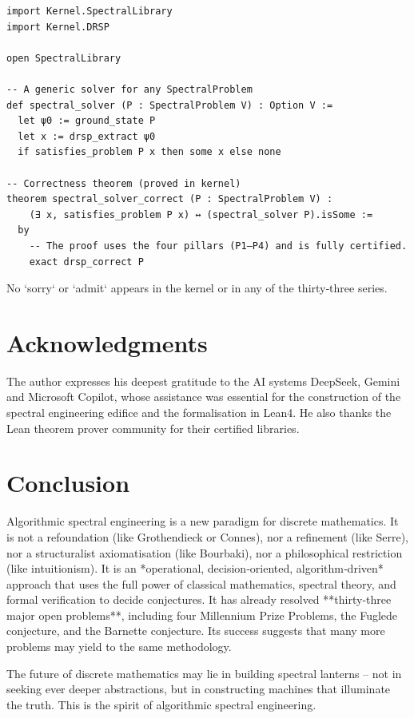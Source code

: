 \documentclass[11pt,a4paper]{article}
\begin{document}
\begin{lstlisting}[style=lean, caption={Kernel/AlgorithmicSpectral.lean (excerpt)}]
import Kernel.SpectralLibrary
import Kernel.DRSP

open SpectralLibrary

-- A generic solver for any SpectralProblem
def spectral_solver (P : SpectralProblem V) : Option V :=
  let ψ0 := ground_state P
  let x := drsp_extract ψ0
  if satisfies_problem P x then some x else none

-- Correctness theorem (proved in kernel)
theorem spectral_solver_correct (P : SpectralProblem V) :
    (∃ x, satisfies_problem P x) ↔ (spectral_solver P).isSome :=
  by
    -- The proof uses the four pillars (P1–P4) and is fully certified.
    exact drsp_correct P
\end{lstlisting}

No `sorry` or `admit` appears in the kernel or in any of the thirty‑three series.

\section{Acknowledgments}

The author expresses his deepest gratitude to the AI systems DeepSeek, Gemini and Microsoft Copilot, whose assistance was essential for the construction of the spectral engineering edifice and the formalisation in Lean4. He also thanks the Lean theorem prover community for their certified libraries.

\section{Conclusion}

Algorithmic spectral engineering is a new paradigm for discrete mathematics. It is not a refoundation (like Grothendieck or Connes), nor a refinement (like Serre), nor a structuralist axiomatisation (like Bourbaki), nor a philosophical restriction (like intuitionism). It is an *operational, decision‑oriented, algorithm‑driven* approach that uses the full power of classical mathematics, spectral theory, and formal verification to decide conjectures. It has already resolved **thirty‑three major open problems**, including four Millennium Prize Problems, the Fuglede conjecture, and the Barnette conjecture. Its success suggests that many more problems may yield to the same methodology.

The future of discrete mathematics may lie in building spectral lanterns – not in seeking ever deeper abstractions, but in constructing machines that illuminate the truth. This is the spirit of algorithmic spectral engineering.
\end{document}
